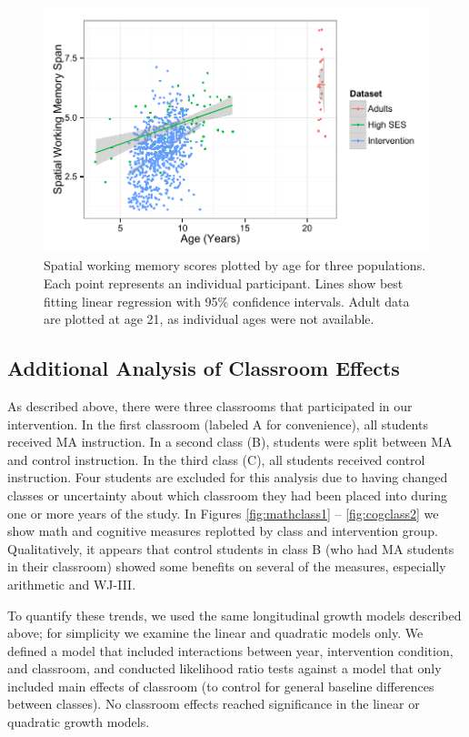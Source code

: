 \documentclass[11pt]{article}
\begin{document}
\begin{figure}[H]
\begin{center}
\includegraphics[width=4.5in]{figures/swm.pdf}
\end{center}
\caption{Spatial working memory scores plotted by age for three populations. Each point represents an individual participant. Lines show best fitting linear regression with 95\% confidence intervals. Adult data are plotted at age 21, as individual ages were not available.}
\label{fig:swm}
\end{figure}


\subsection{Additional Analysis of Classroom Effects}

As described above, there were three classrooms that participated in our intervention. In the first classroom (labeled A for convenience), all students received MA instruction. In a second class (B), students were split between MA and control instruction. In the third class (C), all students received control instruction. Four students are excluded for this analysis due to having changed classes or uncertainty about which classroom they had been placed into during one or more years of the study. In Figures \ref{fig:mathclass1} -- \ref{fig:cogclass2} we show math and cognitive measures replotted by class and intervention group. Qualitatively, it appears that control students in class B (who had MA students in their classroom) showed some benefits on several of the measures, especially arithmetic and WJ-III. 

To quantify these trends, we used the same longitudinal growth models described above; for simplicity we examine the linear and quadratic models only. We defined a model that included interactions between year, intervention condition, and classroom, and conducted likelihood ratio tests against a model that only included main effects of classroom (to control for general baseline differences between classes). No classroom effects reached significance in the linear or quadratic growth models. 
\end{document}
